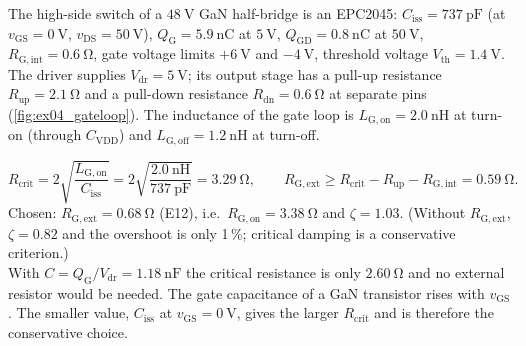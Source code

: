 


The high-side switch of a $\SI{48}{\volt}$ GaN half-bridge is an EPC2045: $C_\mathrm{iss}=\SI{737}{\pico\farad}$ (at $v_\mathrm{GS}=\SI{0}{\volt}$, $v_\mathrm{DS}=\SI{50}{\volt}$), $Q_\mathrm{G}=\SI{5.9}{\nano\coulomb}$ at $\SI{5}{\volt}$, $Q_\mathrm{GD}=\SI{0.8}{\nano\coulomb}$ at $\SI{50}{\volt}$, $R_\mathrm{G,int}=\SI{0.6}{\ohm}$, gate voltage limits $+\SI{6}{\volt}$ and $-\SI{4}{\volt}$, threshold voltage $V_\mathrm{th}=\SI{1.4}{\volt}$. The driver supplies $V_\mathrm{dr}=\SI{5}{\volt}$; its output stage has a pull-up resistance $R_\mathrm{up}=\SI{2.1}{\ohm}$ and a pull-down resistance $R_\mathrm{dn}=\SI{0.6}{\ohm}$ at separate pins (\autoref{fig:ex04_gateloop}). The inductance of the gate loop is $L_\mathrm{G,on}=\SI{2.0}{\nano\henry}$ at turn-on (through $C_\mathrm{VDD}$) and $L_\mathrm{G,off}=\SI{1.2}{\nano\henry}$ at turn-off.




\begin{solutionblock}
	\begin{equation}
		R_\mathrm{crit}=2\sqrt{\frac{L_\mathrm{G,on}}{C_\mathrm{iss}}}=2\sqrt{\frac{\SI{2.0}{\nano\henry}}{\SI{737}{\pico\farad}}}=\SI{3.29}{\ohm},\qquad
		R_\mathrm{G,ext}\geq R_\mathrm{crit}-R_\mathrm{up}-R_\mathrm{G,int}=\SI{0.59}{\ohm}.
	\end{equation}
	Chosen: $R_\mathrm{G,ext}=\SI{0.68}{\ohm}$ (E12), i.e.\ $R_\mathrm{G,on}=\SI{3.38}{\ohm}$ and $\zeta=1.03$. (Without $R_\mathrm{G,ext}$, $\zeta=0.82$ and the overshoot is only 1\,\%; critical damping is a conservative criterion.)\\
	With $C=Q_\mathrm{G}/V_\mathrm{dr}=\SI{1.18}{\nano\farad}$ the critical resistance is only $\SI{2.60}{\ohm}$ and no external resistor would be needed. The gate capacitance of a GaN transistor rises with $v_\mathrm{GS}$. The smaller value, $C_\mathrm{iss}$ at $v_\mathrm{GS}=\SI{0}{\volt}$, gives the larger $R_\mathrm{crit}$ and is therefore the conservative choice.
\end{solutionblock}

